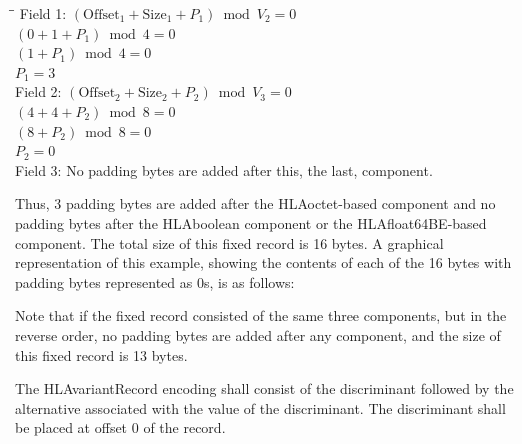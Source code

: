 \begin{tabbing}
    \hspace{45pt}\=\hspace{18pt}\=\kill
    Field 1: \> $(\mathrm{Offset}_1 + \mathrm{Size}_1 + P_1) \bmod V_2 = 0$\\
    \> $(0 + 1 + P_1) \bmod 4 = 0$\\
    \> $(1 + P_1) \bmod 4 = 0$\\
    \> $P_1 = 3$\\[4pt]
    Field 2: \> $(\mathrm{Offset}_2 + \mathrm{Size}_2 + P_2) \bmod V_3 = 0$\\
    \> $(4 + 4 + P_2) \bmod 8 = 0$\\
    \> $(8 + P_2) \bmod 8 = 0$\\
    \> $P_2 = 0$\\[4pt]
    Field 3: \> No padding bytes are added after this, the last, component.
\end{tabbing}

Thus, 3 padding bytes are added after the HLAoctet-based component and no padding bytes after the HLAboolean component or the HLAfloat64BE-based component. The total size of this fixed record is 16 bytes. A graphical representation of this example, showing the contents of each of the 16 bytes with padding bytes represented as 0s, is as follows:

\begin{center}
    \begingroup\fontsize{7.5}{8.6}\selectfont\setlength{\tabcolsep}{3.7pt}\renewcommand{\arraystretch}{1.34}
    \endgroup
\end{center}

Note that if the fixed record consisted of the same three components, but in the reverse order, no padding bytes are added after any component, and the size of this fixed record is 13 bytes.

\par{}\par\vspace{1pt}
The HLAvariantRecord encoding shall consist of the discriminant followed by the alternative associated with the value of the discriminant. The discriminant shall be placed at offset 0 of the record.

